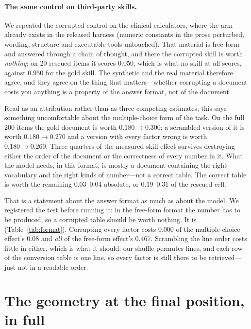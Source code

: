 \documentclass{article}
\begin{document}
\paragraph{The same control on third-party skills.} We repeated the corrupted
control on the clinical calculators, where the arm already exists in the
released harness (numeric constants in the prose perturbed, wording, structure
and executable tools untouched). That material is free-form and answered through
a chain of thought, and there the corrupted skill is worth \emph{nothing}: on 20
rescued items it scores $0.050$, which is what no skill at all scores, against
$0.950$ for the gold skill. The synthetic and the real material therefore agree,
and they agree on the thing that matters---whether corrupting a document costs
you anything is a property of the answer format, not of the document.

Read as an attribution rather than as three competing estimates, this says
something uncomfortable about the multiple-choice form of the task. On the full
200 items the gold document is worth $0.180 \to 0.300$; a scrambled version of
it is worth $0.180 \to 0.270$ and a version with every factor wrong is worth
$0.180 \to 0.260$. Three quarters of the measured skill effect survives
destroying either the order of the document or the correctness of every number
in it. What the model needs, in this format, is mostly a document containing the
right vocabulary and the right kinds of number---not a correct table. The
correct table is worth the remaining $0.03$--$0.04$ absolute, or $0.19$--$0.31$
of the rescued cell.

That is a statement about the answer format as much as about the model. We
registered the test before running it: in the free-form format the number has to
be produced, so a corrupted table should be worth nothing. It is
(Table~\ref{tab:format}). Corrupting every factor costs $0.000$ of the
multiple-choice effect's $0.08$ and \emph{all} of the free-form effect's
$0.467$. Scrambling the line order costs little in either, which is what it
should: our shuffle permutes lines, and each row of the conversion table is one
line, so every factor is still there to be retrieved---just not in a readable
order.


\section{The geometry at the final position, in full}
\label{app:geometry}
\end{document}
